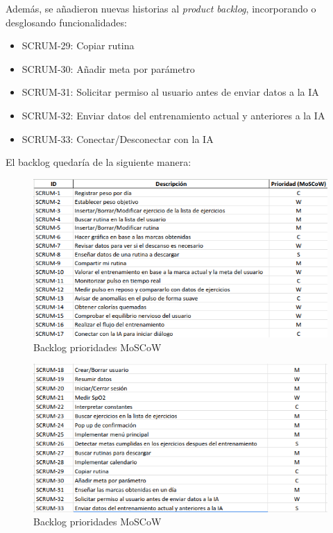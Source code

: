 Además, se añadieron nuevas historias al \textit{product backlog}, incorporando o desglosando funcionalidades:

\begin{itemize}
  \item SCRUM-29: Copiar rutina
  \item SCRUM-30: Añadir meta por parámetro
  \item SCRUM-31: Solicitar permiso al usuario antes de enviar datos a la IA
  \item SCRUM-32: Enviar datos del entrenamiento actual y anteriores a la IA
  \item SCRUM-33: Conectar/Desconectar con la IA
\end{itemize}

El backlog quedaría de la siguiente manera:

\begin{landscape}
\begin{figure}[H]
   \centering
    \includegraphics[width=1.5\textwidth]{tablas/backlog1.png}
    \caption{Backlog prioridades MoSCoW}
    \label{fig:backlog1}
\end{figure}
\end{landscape}

\begin{landscape}
\begin{figure}[H]
   \centering
    \includegraphics[width=1.5\textwidth]{tablas/backlog2.png}
    \caption{Backlog prioridades MoSCoW}
    \label{fig:backlog2}
\end{figure}
\end{landscape}

